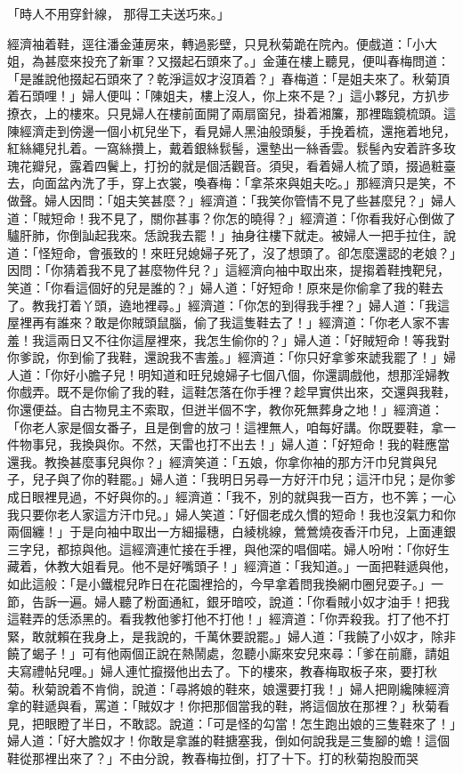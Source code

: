 「時人不用穿針線，  那得工夫送巧來。」

經濟袖着鞋，逕往潘金蓮房來，轉過影壁，只見秋菊跪在院內。便戲道：「小大姐，為甚麼來投充了新軍？又掇起石頭來了。」金蓮在樓上聽見，便叫春梅問道：「是誰說他掇起石頭來了？乾淨這奴才沒頂着？」春梅道：「是姐夫來了。秋菊頂着石頭哩！」婦人便叫：「陳姐夫，樓上沒人，你上來不是？」這小夥兒，方扒步撩衣，上的樓來。只見婦人在樓前面開了兩扇窗兒，掛着湘簾，那裡臨鏡梳頭。這陳經濟走到傍邊一個小杌兒坐下，看見婦人黑油般頭髮，手挽着梳，還拖着地兒，紅絲繩兒扎着。一窩絲攢上，戴着銀絲䯼髻，還墊出一絲香雲。䯼髻內安着許多玫瑰花瓣兒，露着四鬢上，打扮的就是個活觀音。須臾，看着婦人梳了頭，掇過粧臺去，向面盆內洗了手，穿上衣裳，喚春梅：「拿茶來與姐夫吃。」那經濟只是笑，不做聲。婦人因問：「姐夫笑甚麼？」經濟道：「我笑你管情不見了些甚麼兒？」婦人道：「賊短命！我不見了，關你甚事？你怎的曉得？」經濟道：「你看我好心倒做了驢肝肺，你倒訕起我來。恁說我去罷！」抽身往樓下就走。被婦人一把手拉住，說道：「怪短命，會張致的！來旺兒媳婦子死了，沒了想頭了。卻怎麼還認的老娘？」因問：「你猜着我不見了甚麼物件兒？」這經濟向袖中取出來，提搊着鞋拽靶兒，笑道：「你看這個好的兒是誰的？」婦人道：「好短命！原來是你偷拿了我的鞋去了。教我打着丫頭，遶地裡尋。」經濟道：「你怎的到得我手裡？」婦人道：「我這屋裡再有誰來？敢是你賊頭鼠腦，偷了我這隻鞋去了！」經濟道：「你老人家不害羞！我這兩日又不往你這屋裡來，我怎生偷你的？」婦人道：「好賊短命！等我對你爹說，你到偷了我鞋，還說我不害羞。」經濟道：「你只好拿爹來諕我罷了！」婦人道：「你好小膽子兒！明知道和旺兒媳婦子七個八個，你還調戲他，想那淫婦教你戲弄。既不是你偷了我的鞋，這鞋怎落在你手裡？趁早實供出來，交還與我鞋，你還便益。自古物見主不索取，但迸半個不字，教你死無葬身之地！」經濟道：「你老人家是個女番子，且是倒會的放刁！這裡無人，咱每好講。你既要鞋，拿一件物事兒，我換與你。不然，天雷也打不出去！」婦人道：「好短命！我的鞋應當還我。教換甚麼事兒與你？」經濟笑道：「五娘，你拿你袖的那方汗巾兒賞與兒子，兒子與了你的鞋罷。」婦人道：「我明日另尋一方好汗巾兒；這汗巾兒；是你爹成日眼裡見過，不好與你的。」經濟道：「我不，別的就與我一百方，也不筭；一心我只要你老人家這方汗巾兒。」婦人笑道：「好個老成久慣的短命！我也沒氣力和你兩個纏！」于是向袖中取出一方細撮穗，白綾桃線，鶯鶯燒夜香汗巾兒，上面連銀三字兒，都掠與他。這經濟連忙接在手裡，與他深的唱個喏。婦人吩咐：「你好生藏着，休教大姐看見。他不是好嘴頭子！」經濟道：「我知道。」一面把鞋遞與他，如此這般：「是小鐵棍兒昨日在花園裡拾的，今早拿着問我換網巾圈兒耍子。」一節，告訴一遍。婦人聽了粉面通紅，銀牙暗咬，說道：「你看賊小奴才油手！把我這鞋弄的恁添黑的。看我教他爹打他不打他！」經濟道：「你弄殺我。打了他不打緊，敢就賴在我身上，是我說的，千萬休要說罷。」婦人道：「我饒了小奴才，除非饒了蝎子！」可有他兩個正說在熱鬧處，忽聽小廝來安兒來尋：「爹在前廳，請姐夫寫禮帖兒哩。」婦人連忙攛掇他出去了。下的樓來，教春梅取板子來，要打秋菊。秋菊說着不肯倘，說道：「尋將娘的鞋來，娘還要打我！」婦人把剛纔陳經濟拿的鞋遞與看，罵道：「賊奴才！你把那個當我的鞋，將這個放在那裡？」秋菊看見，把眼瞪了半日，不敢認。說道：「可是怪的勾當！怎生跑出娘的三隻鞋來了！」婦人道：「好大膽奴才！你敢是拿誰的鞋搪塞我，倒如何說我是三隻腳的蟾！這個鞋從那裡出來了？」不由分說，教春梅拉倒，打了十下。打的秋菊抱股而哭